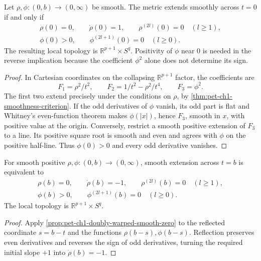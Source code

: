\begin{proposition}[Smoothness at $t=0$]
  \label{prop:pet-ch1-doubly-warped-smooth-zero}
  \leanok
  Let $\rho,\phi:(0,b)\to(0,\infty)$ be smooth. The metric extends smoothly
  across $t=0$ if and only if
  \[
  \begin{gathered}
    \rho(0)=0,\qquad \dot\rho(0)=1,
    \qquad \rho^{(2l)}(0)=0\quad(l\ge1),\\
    \phi(0)>0,
    \qquad \phi^{(2l+1)}(0)=0\quad(l\ge0).
  \end{gathered}
  \]
  The resulting local topology is $\mathbb{R}^{p+1}\times S^q$. Positivity of
  $\phi$ near $0$ is needed in the reverse implication because the coefficient
  $\phi^2$ alone does not determine its sign.
\end{proposition}
\begin{proof}
  \leanok
  \sketch
  In Cartesian coordinates on the collapsing $\mathbb{R}^{p+1}$ factor, the
  coefficients are
  \[
    F_1=\rho^2/t^2,\qquad F_2=1/t^2-\rho^2/t^4,
    \qquad F_3=\phi^2.
  \]
  The first two extend precisely under the conditions on $\rho$, by
  \cref{thm:pet-ch1-smoothness-criterion}. If the odd derivatives of $\phi$
  vanish, its odd part is flat and Whitney's even-function theorem makes
  $\phi(|x|)$, hence $F_3$, smooth in $x$, with positive value at the origin.
  Conversely, restrict a smooth positive extension of $F_3$ to a line.
  Its positive square root is smooth and even and agrees with $\phi$ on the
  positive half-line. Thus $\phi(0)>0$ and every odd derivative vanishes.
\end{proof}

\begin{proposition}[Smoothness at $t=b$]
  \label{prop:pet-ch1-doubly-warped-smooth-b}
  \leanok
  For smooth positive $\rho,\phi:(0,b)\to(0,\infty)$, smooth extension across
  $t=b$ is equivalent to
  \[
  \begin{gathered}
    \rho(b)=0,\qquad \dot\rho(b)=-1,
    \qquad \rho^{(2l)}(b)=0\quad(l\ge1),\\
    \phi(b)>0,
    \qquad \phi^{(2l+1)}(b)=0\quad(l\ge0).
  \end{gathered}
  \]
  The local topology is $\mathbb{R}^{p+1}\times S^q$.
\end{proposition}
\begin{proof}
  \leanok
  \sketch
  Apply \cref{prop:pet-ch1-doubly-warped-smooth-zero} to the reflected
  coordinate $s=b-t$ and the functions $\rho(b-s),\phi(b-s)$. Reflection
  preserves even derivatives and reverses the sign of odd derivatives, turning
  the required initial slope $+1$ into $\dot\rho(b)=-1$.
\end{proof}

